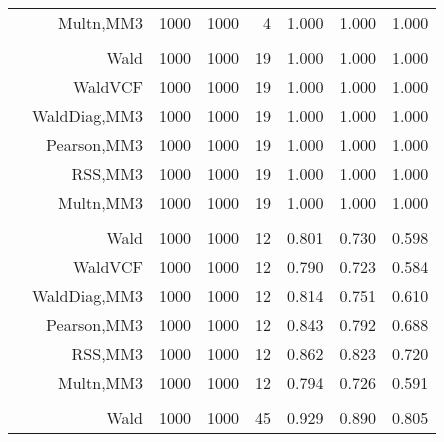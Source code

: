 \documentclass[
]{article}
\begin{document}
\begin{table}[H]
{\begin{tabular}[t]{lrrrrrrr}
\hspace{1em} & Multn,MM3 & 1000 & 1000 & 4 & 1.000 & 1.000 & 1.000\\
\cmidrule{1-8}
\addlinespace[0.3em]
\multicolumn{8}{l}{\textbf{1F 15V}}\\
\hspace{1em} & Wald & 1000 & 1000 & 19 & 1.000 & 1.000 & 1.000\\

\hspace{1em} & WaldVCF & 1000 & 1000 & 19 & 1.000 & 1.000 & 1.000\\

\hspace{1em} & WaldDiag,MM3 & 1000 & 1000 & 19 & 1.000 & 1.000 & 1.000\\

\hspace{1em} & Pearson,MM3 & 1000 & 1000 & 19 & 1.000 & 1.000 & 1.000\\

\hspace{1em} & RSS,MM3 & 1000 & 1000 & 19 & 1.000 & 1.000 & 1.000\\

\hspace{1em} & Multn,MM3 & 1000 & 1000 & 19 & 1.000 & 1.000 & 1.000\\
\cmidrule{1-8}
\addlinespace[0.3em]
\multicolumn{8}{l}{\textbf{2F 10V}}\\
\hspace{1em} & Wald & 1000 & 1000 & 12 & 0.801 & 0.730 & 0.598\\

\hspace{1em} & WaldVCF & 1000 & 1000 & 12 & 0.790 & 0.723 & 0.584\\

\hspace{1em} & WaldDiag,MM3 & 1000 & 1000 & 12 & 0.814 & 0.751 & 0.610\\

\hspace{1em} & Pearson,MM3 & 1000 & 1000 & 12 & 0.843 & 0.792 & 0.688\\

\hspace{1em} & RSS,MM3 & 1000 & 1000 & 12 & 0.862 & 0.823 & 0.720\\

\hspace{1em} & Multn,MM3 & 1000 & 1000 & 12 & 0.794 & 0.726 & 0.591\\
\cmidrule{1-8}
\addlinespace[0.3em]
\multicolumn{8}{l}{\textbf{3F 15V}}\\
\hspace{1em} & Wald & 1000 & 1000 & 45 & 0.929 & 0.890 & 0.805\\


\end{tabular}}
\end{table}
\end{document}
